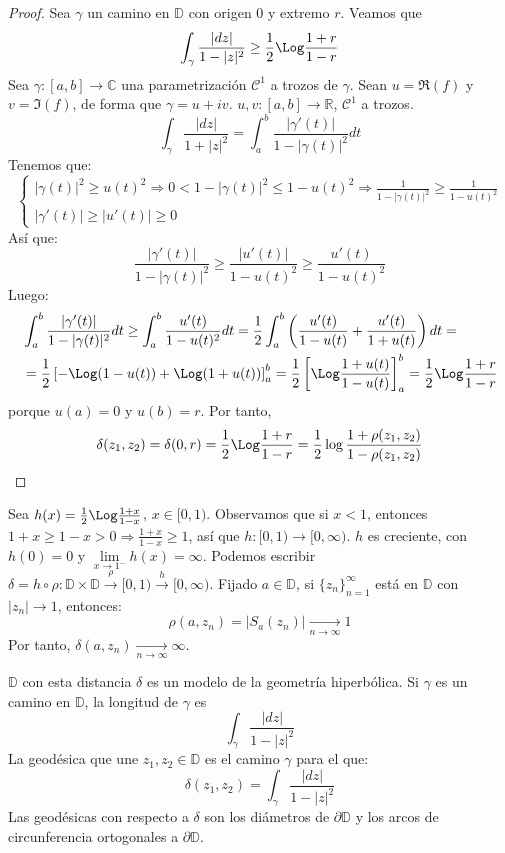 \begin{proof}
    Sea $\gamma$ un camino en $\mathbb{D}$ con origen 0 y extremo $r$.
    Veamos que
    $$\int_\gamma \frac{|dz|}{1-|z|^2} \geq \frac{1}{2} \Log\frac{1+r}{1-r}$$
    Sea $\gamma: [a, b] \to \mathbb{C}$ una parametrización $\mathcal{C}^1$ a trozos de $\gamma$.
    Sean $u = \Re(f)$ y $v= \Im(f)$, de forma que $\gamma = u + iv$.
    $u, v: [a, b] \to \mathbb{R}$, $\mathcal{C}^1$ a trozos.
    $$\int_\gamma \frac{|dz|}{1+|z|^2} = \int_a^b \frac{|\gamma'(t)|}{1-|\gamma(t)|^2}dt$$
    Tenemos que:
    $$\begin{cases}
            |\gamma(t)|^2 \geq u(t)^2 \Rightarrow 0 < 1-|\gamma(t)|^2 \leq 1-u(t)^2 \Rightarrow \frac{1}{1-|\gamma(t)|^2} \geq \frac{1}{1-u(t)^2} \\
            |\gamma'(t)| \geq |u'(t)| \geq 0
        \end{cases}$$
    Así que:
    $$\frac{|\gamma'(t)|}{1-|\gamma(t)|^2} \geq \frac{|u'(t)|}{1-u(t)^2} \geq \frac{u'(t)}{1-u(t)^2}$$
    Luego:
    \begin{align*}
         & \int_a^b \frac{|\gamma'(t)|}{1-|\gamma(t)|^2}dt \geq \int_a^b \frac{u'(t)}{1-u(t)^2}dt = \frac{1}{2} \int_a^b \left(\frac{u'(t)}{1-u(t)} + \frac{u'(t)}{1+u(t)}\right)dt = \\
         & = \frac{1}{2} \left[-\Log(1-u(t)) + \Log(1+u(t))\right]_a^b = \frac{1}{2} \left[\Log \frac{1+u(t)}{1-u(t)}\right]_a^b = \frac{1}{2} \Log\frac{1+r}{1-r}
    \end{align*}
    porque $u(a) = 0$ y $u(b) = r$.
    Por tanto,
    $$\delta(z_1, z_2) = \delta(0, r) = \frac{1}{2} \Log\frac{1+r}{1-r} = \frac{1}{2} \log\frac{1+\rho(z_1, z_2)}{1-\rho(z_1, z_2)}$$
\end{proof}

\begin{remark}
    Sea $h(x) = \frac{1}{2} \Log \frac{1+x}{1-x}$, $x \in [0, 1)$.
    Observamos que si $x < 1$, entonces $1+x \geq 1-x > 0 \Rightarrow \frac{1+x}{1-x} \geq 1$, así que $h: [0, 1) \to [0, \infty)$.
    $h$ es creciente, con $h(0) = 0$ y $\lim\limits_{x \to 1^-} h(x) = \infty$.
    Podemos escribir $\delta = h \circ \rho : \mathbb{D} \times \mathbb{D} \xrightarrow{\rho} [0, 1) \xrightarrow{h} [0, \infty)$.
    Fijado $a \in \mathbb{D}$, si $\{z_n\}_{n=1}^\infty$ está en $\mathbb{D}$ con $|z_n| \to 1$, entonces:
    $$\rho(a, z_n) = |S_a(z_n)| \xrightarrow[n \to \infty]{} 1$$
    Por tanto, $\delta(a, z_n) \xrightarrow[n \to \infty]{} \infty$.
\end{remark}

$\mathbb{D}$ con esta distancia $\delta$ es un modelo de la geometría hiperbólica.
Si $\gamma$ es un camino en $\mathbb{D}$, la longitud de $\gamma$ es
$$\int_\gamma \frac{|dz|}{1-|z|^2}$$
La geodésica que une $z_1, z_2 \in \mathbb{D}$ es el camino $\gamma$ para el que:
$$\delta(z_1, z_2) = \int_\gamma \frac{|dz|}{1-|z|^2}$$
Las geodésicas con respecto a $\delta$ son los diámetros de $\partial \mathbb{D}$ y los arcos de circunferencia ortogonales a $\partial \mathbb{D}$.